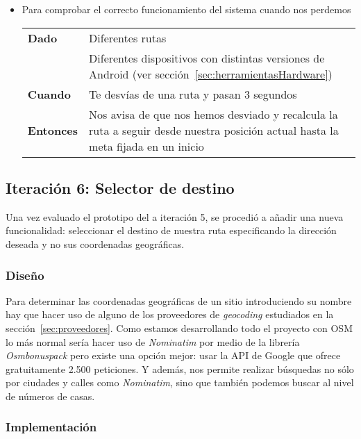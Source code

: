 \begin{itemize}
  \item Para comprobar el correcto funcionamiento del sistema cuando nos perdemos

  \begin{tabular}{p{}p{}}
    \hline
    \textbf{Dado}     & Diferentes rutas \\
                      & Diferentes dispositivos con distintas versiones de Android (ver
                        sección~\ref{sec:herramientasHardware}) \\
    \textbf{Cuando}   & Te desvías de una ruta y pasan 3 segundos \\
    \textbf{Entonces} & Nos avisa de que nos hemos desviado y recalcula la ruta a seguir desde
                        nuestra posición actual hasta la meta fijada en un inicio \\
    \hline
  \end{tabular}
\end{itemize}

\subsection{Iteración 6: Selector de destino}

Una vez evaluado el prototipo del a iteración 5, se procedió a añadir una nueva funcionalidad:
seleccionar el destino de nuestra ruta especificando la dirección deseada y no sus coordenadas
geográficas.

\subsubsection{Diseño}

Para determinar las coordenadas geográficas de un sitio introduciendo su nombre hay que hacer uso de
alguno de los proveedores de \emph{geocoding} estudiados en la sección~\ref{sec:proveedores}. Como
estamos desarrollando todo el proyecto con \acs{OSM} lo más normal sería hacer uso de
\emph{Nominatim} por medio de la librería \emph{Osmbonuspack} pero existe una opción mejor: usar la
\acs{API} de Google que ofrece gratuitamente 2.500 peticiones. Y además, nos permite realizar
búsquedas no sólo por ciudades y calles como \emph{Nominatim}, sino que también podemos buscar al
nivel de números de casas.

\subsubsection{Implementación}

